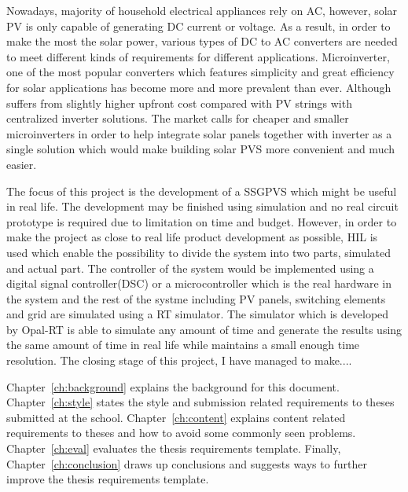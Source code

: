 Nowadays, majority of household electrical appliances rely on \gls{AC}, however, solar \gls{PV} is only capable of generating \gls{DC} current or voltage. As a result, in order to make the most the solar power, various types of DC to AC converters are needed to meet different kinds of requirements for different applications. Microinverter, one of the most popular converters which features simplicity and great efficiency for solar applications has become more and more prevalent than ever. Although suffers from slightly higher upfront cost compared with PV strings with centralized inverter solutions. The market calls for cheaper and smaller microinverters in order to help integrate solar panels together with inverter as a single solution which would make building solar \gls{PVS} more convenient and much easier.

The focus of this project is the development of a \gls{SSGPVS} which might be useful in real life. The development may be finished using simulation and no real circuit prototype is required due to limitation on time and budget.  However, in order to make the project as close to real life product development as possible, \gls{HIL} is used which enable the possibility to divide the system into two parts, simulated and actual part. The controller of the system would be implemented using a digital signal controller(DSC) or a microcontroller which is the real hardware in the system and the rest of the systme including \gls{PV} panels, switching elements and grid are simulated using a \gls{RT} simulator. The simulator which is developed by Opal-RT is able to simulate any amount of time and generate the results using the same amount of time in real life while maintains a small enough time resolution. The closing stage of this project, I have managed to make....



Chapter~\ref{ch:background} explains the background for this document.
Chapter~\ref{ch:style} states the style and submission related requirements
to theses submitted at the school.
Chapter~\ref{ch:content} explains content related requirements to theses and
how to avoid some commonly seen problems.
Chapter~\ref{ch:eval} evaluates the thesis requirements template.  Finally,
Chapter~\ref{ch:conclusion} draws up conclusions and suggests ways to
further improve the thesis requirements template.

